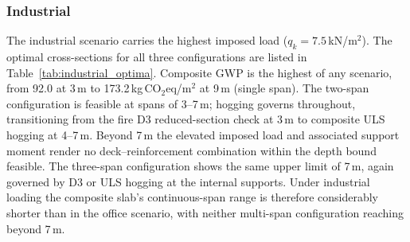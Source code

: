 \subsubsection{Industrial}
\label{sec:res_industrial}
The industrial scenario carries the highest imposed load ($q_k = 7.5$\,kN/m$^2$). The optimal cross-sections for all three configurations are listed in Table~\ref{tab:industrial_optima}. Composite GWP is the highest of any scenario, from 92.0 at 3\,m to 173.2\,kg\,CO$_2$eq/m$^2$ at 9\,m (single span). The two-span configuration is feasible at spans of 3--7\,m; hogging governs throughout, transitioning from the fire D3 reduced-section check at 3\,m to composite ULS hogging at 4--7\,m. Beyond 7\,m the elevated imposed load and associated support moment render no deck--reinforcement combination within the depth bound feasible. The three-span configuration shows the same upper limit of 7\,m, again governed by D3 or ULS hogging at the internal supports. Under industrial loading the composite slab's continuous-span range is therefore considerably shorter than in the office scenario, with neither multi-span configuration reaching beyond 7\,m.

